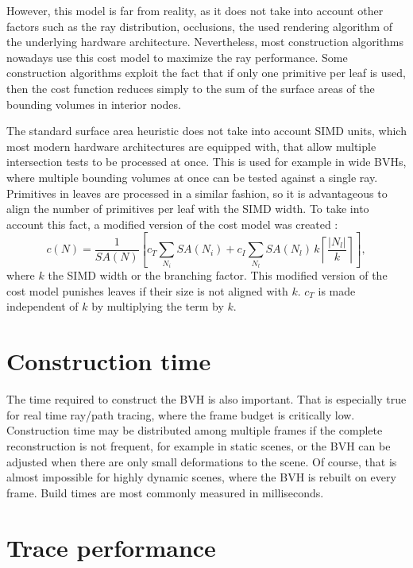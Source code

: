 However, this model is far from reality, as it does not take into account other factors such as the ray distribution, occlusions, the used rendering algorithm of the underlying hardware architecture. Nevertheless, most construction algorithms nowadays use this cost model to maximize the ray performance. Some construction algorithms exploit the fact that if only one primitive per leaf is used, then the cost function reduces simply to the sum of the surface areas of the bounding volumes in interior nodes. \cite{MB22}

The standard surface area heuristic does not take into account SIMD units, which most modern hardware architectures are equipped with, that allow multiple intersection tests to be processed at once. This is used for example in wide BVHs, where multiple bounding volumes at once can be tested against a single ray. Primitives in leaves are processed in a similar fashion, so it is advantageous to align the number of primitives per leaf with the SIMD width. To take into account this fact, a modified version of the cost model was created \cite{WBB08}:
\begin{equation}
    \label{eq:SAH-cost-model-SIMD}
    c(N) = \frac{1}{SA(N)}
    \left[
        c_T \sum_{N_i} SA(N_i)
        + c_I \sum_{N_l} SA(N_l)\, k \left\lceil \frac{|N_l|}{k} \right\rceil
    \right],
\end{equation}
where $k$ the SIMD width or the branching factor. This modified version of the cost model punishes leaves if their size is not aligned with $k$. $c_T$ is made independent of $k$ by multiplying the term by $k$. \cite{MB22}

\section{Construction time}


The time required to construct the BVH is also important. That is especially true for real time ray/path tracing, where the frame budget is critically low. Construction time may be distributed among multiple frames if the complete reconstruction is not frequent, for example in static scenes, or the BVH can be adjusted when there are only small deformations to the scene. Of course, that is almost impossible for highly dynamic scenes, where the BVH is rebuilt on every frame. Build times are most commonly measured in milliseconds.

\section{Trace performance}

